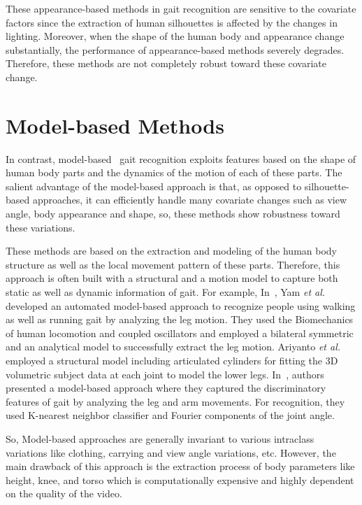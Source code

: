 These appearance-based methods in gait recognition are sensitive to the covariate factors since the extraction of human silhouettes is affected by the changes in lighting. Moreover, when the shape of the human body and appearance change substantially, the performance of appearance-based methods severely degrades. Therefore, these methods are not completely robust toward these covariate change.



\section{Model-based Methods} \label{sec:model_based_methods}
In contrast, model-based~\cite{Yam_04, Ariyanto_11, Tafazzoli_10, Feng_16} gait recognition exploits features based on the shape of human body parts and the dynamics of the motion of each of these parts. The salient advantage of the model-based approach is that, as  opposed to silhouette-based approaches, it can efficiently handle many covariate changes such as view angle, body appearance and shape, so, these methods show robustness toward these variations. 

These methods are based on the extraction and modeling of the human body structure as well as the local movement pattern of these parts. Therefore, this approach is often built with a structural and a motion model to capture both static as well as dynamic information of gait. For example, In~\cite{Yam_04}, Yam \textit{et al.} developed an automated model-based approach to recognize people using walking as well as running gait by analyzing the leg motion. They used the Biomechanics of human locomotion and coupled oscillators and employed a bilateral symmetric and an analytical model to successfully extract the leg motion. Ariyanto \textit{et al.}~\cite{Ariyanto_11} employed a structural model including articulated cylinders for fitting the 3D volumetric subject data at each joint to model the lower legs. In~\cite{Tafazzoli_10}, authors presented a model-based approach where they captured the discriminatory features of gait by analyzing the leg and arm movements. For recognition, they used K-nearest neighbor classifier and Fourier components of the joint angle. 

So, Model-based approaches are generally invariant to various intraclass variations like clothing, carrying and view angle variations, etc. However, the main drawback of this approach is the extraction process of body parameters like height, knee, and torso which is computationally expensive and highly dependent on the quality of the video.


